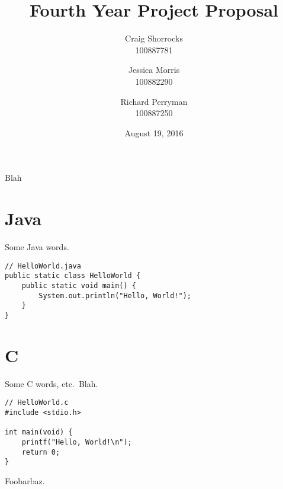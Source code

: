 \documentclass{article}
\title{Fourth Year Project Proposal}
\author{
	Craig Shorrocks \\
	100887781
	\and
	Jessica Morris \\
	100882290
	\and
	Richard Perryman \\
	100887250
}
\date{August 19, 2016}
\begin{document}
\maketitle

\pagebreak

Blah

\section{Java}

Some Java words.

\lstset{language=Java}

\begin{lstlisting}
// HelloWorld.java
public static class HelloWorld {
	public static void main() {
		System.out.println("Hello, World!");
	}
}
\end{lstlisting}

\section{C}

Some C words, etc.\ Blah.

\lstset{
	language=C,
	showstringspaces=false
}

\begin{lstlisting}
// HelloWorld.c
#include <stdio.h>

int main(void) {
	printf("Hello, World!\n");
	return 0;
}
\end{lstlisting}

Foobarbaz.
\end{document}
